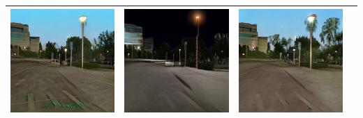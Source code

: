 \documentclass{VUMIFPSbakalaurinis}
\begin{document}
\begin{table}[H]
{\begin{tabular}{|c|c|c|c|}
            \includegraphics[scale=0.35]{img/pvz/7_cycle} & \includegraphics[scale=0.35]{img/pvz/7_cut} & \includegraphics[scale=0.35]{img/pvz/7_mspc}
            \\
            \hline
            \end{tabular}
        }
        \label{tab:table example}
    \end{table}
\end{document}
